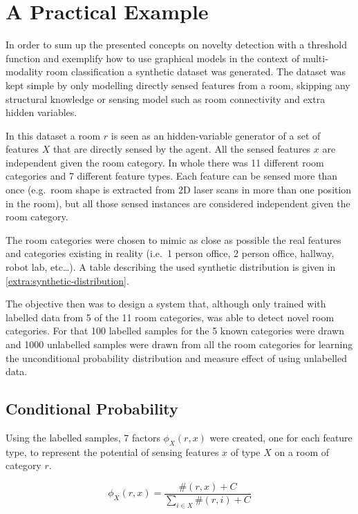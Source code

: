 \clearpage
\section{A Practical Example}
\label{sec:unlabelled-data}
In order to sum up the presented concepts on novelty detection with a threshold
function and exemplify how to use graphical models in the context of
multi-modality room classification a synthetic dataset was generated.
The dataset was kept simple by only modelling directly sensed features from a
room, skipping any structural knowledge or sensing model such as room
connectivity and extra hidden variables.

In this dataset a room $r$ is seen as an hidden-variable generator of a set of
features $X$ that are directly sensed by the agent.
All the sensed features $x$ are independent given the room category.
In whole there was 11 different room categories and 7 different feature types.
Each feature can be sensed more than once (e.g.\ room shape is extracted from 2D
laser scans in more than one position in the room), but all those sensed
instances are considered independent given the room category.

The room categories were chosen to mimic as close as possible the real features
and categories existing in reality (i.e.\ 1 person office, 2 person office,
hallway, robot lab, etc\dots). A table describing the used synthetic
distribution is given in \autoref{extra:synthetic-distribution}.

The objective then was to design a system that, although only trained with
labelled data from 5 of the 11 room categories, was able to detect novel
room categories.
For that 100 labelled samples for the 5 known categories were drawn and 1000 
unlabelled samples were drawn from all the room categories for learning the
unconditional probability distribution and measure effect of using unlabelled
data.

\subsection{Conditional Probability}
Using the labelled samples, 7 factors $\phi_X(r,x)$ were created, one for each
feature type, to represent the potential of sensing features $x$ of type $X$ on
a room of category $r$.

\begin{equation}
\phi_X(r,x) = \frac{\#(r,x)+C}{\sum_{i \in X}{\#(r,i)+C}}
\end{equation}

